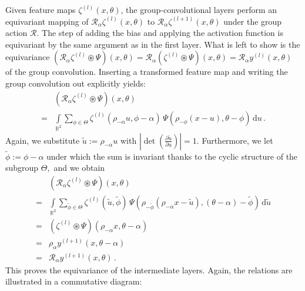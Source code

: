 \documentclass[10pt,twocolumn,letterpaper]{article}
\begin{document}
Given feature maps $\zeta^{(l)}(x,\theta)$, the group-convolutional layers perform an equivariant mapping of $\mathcal{R}_\alpha\zeta^{(l)}(x,\theta)$ to $\mathcal{R}_\alpha\zeta^{(l+1)}(x,\theta)$ under the group action $\mathcal{R}.$
The step of adding the bias and applying the activation function is equivariant by the same argument as in the first layer.
What is left to show is the equivariance $\left(\mathcal{R}_\alpha\zeta^{(l)}\circledast\Psi\right)(x,\theta) = \mathcal{R}_\alpha\left(\zeta^{(l)}\circledast\Psi\right)(x,\theta) = \mathcal{R}_\alpha y^{(l)}(x,\theta)$ of the group convolution.
Inserting a transformed feature map and writing the group convolution out explicitly yields:
\begin{align*}
& \left(\mathcal{R}_\alpha\zeta^{(l)}\circledast\Psi\right)(x,\theta) \\
=& \int\limits_{\mathbb{R}^2} \sum_{\phi\in\Theta} \zeta^{(l)}(\rho_{-\alpha}u,\phi-\alpha)\, \Psi(\rho_{-\phi}(x-u),\theta-\phi) \, \mathrm{d}u \,.
\end{align*}
Again, we substitute $\tilde{u}:=\rho_{-\alpha}u$ with $\left|\det\left(\frac{\partial \tilde{u}}{\partial u}\right)\right|=1.$
Furthermore, we let $\tilde{\phi}:=\phi-\alpha$ under which the sum is invariant thanks to the cyclic structure of the subgroup $\Theta,$ and we obtain
\begin{align*}
	& \left(\mathcal{R}_\alpha\zeta^{(l)}\circledast\Psi\right)(x,\theta) \\
	=& \int\limits_{\mathbb{R}^2} \sum_{\tilde{\phi}\in\Theta} \zeta^{(l)}(\tilde{u},\tilde{\phi})\, \Psi(\rho_{-\tilde{\phi}}(\rho_{-\alpha}x-\tilde{u}),(\theta-\alpha) - \tilde{\phi}) \, \mathrm{d}\tilde{u}\\ 
	=& \left(\zeta^{(l)}\circledast\Psi\right)(\rho_{-\alpha}x,\theta-\alpha) \\
	=& \rho_\alpha y^{(l+1)}(x,\theta-\alpha) \\
	=& \mathcal{R}_\alpha y^{(l+1)}(x,\theta)\,.
\end{align*}
This proves the equivariance of the intermediate layers.
Again, the relations are illustrated in a commutative diagram:
\begin{center}
\end{center}
\end{document}
